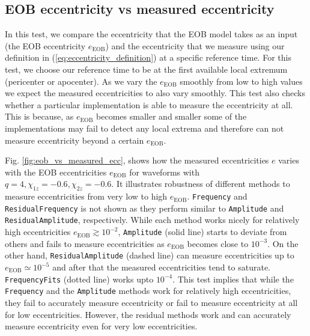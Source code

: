 \documentclass[aps,prd,amsmath,floats,floatfix, twocolumn,
superscriptaddress,nofootinbib,showpacs]{revtex4-1}
\newcommand{\eEOB}{e_{\text{EOB}}}
\newcommand{\mAmp}{\texttt{Amplitude}}
\newcommand{\mFreq}{\texttt{Frequency}}
\newcommand{\mResAmp}{\texttt{ResidualAmplitude}}
\newcommand{\mResFreq}{\texttt{ResidualFrequency}}
\newcommand{\mFreqFits}{\texttt{FrequencyFits}}
\begin{document}
\subsection{EOB eccentricity vs measured eccentricity}
\label{sec:eob-eccentricity-vs-measured-eccentricity} In this test, we
compare the eccentricity that the EOB model takes as an input (the EOB
eccentricity $\eEOB$) and the eccentricity that we measure
using our definition in (\ref{eq:eccentricity_definition}) at a
specific reference time. For this test, we choose our reference time
to be at the first available local extremum (pericenter or
apocenter). As we vary the $\eEOB$ smoothly from low to high
values we expect the measured eccentricities to also vary smoothly.
This test also checks whether a particular implementation is able to
measure the eccentricity at all. This is because, as $\eEOB$
becomes smaller and smaller some of the implementations may fail to
detect any local extrema and therefore can not measure eccentricity
beyond a certain $\eEOB$.

Fig. \ref{fig:eob_vs_measured_ecc}, shows how the measured
eccentricities $e$ varies with the EOB eccentricities $\eEOB$ for
waveforms with $q=4, \chi_{1z}=-0.6, \chi_{2z}=-0.6$. It illustrates
robustness of different methods to measure eccentricities from very
low to high $\eEOB$. \mFreq{} and \mResFreq{} is not shown as they
perform similar to \mAmp{} and \mResAmp{}, respectively.  While each
method works nicely for relatively high eccentricities $\eEOB \gtrsim
10^{-2}$, \mAmp{} (solid line) starts to deviate from others and fails
to measure eccentricities as $\eEOB$ becomes close to $10^{-3}$. On
the other hand, \mResAmp{} (dashed line) can measure eccentricities up
to $\eEOB \simeq 10^{-5}$ and after that the measured eccentricities
tend to saturate. \mFreqFits{} (dotted line) works upto
$10^{-4}$. This test implies that while the \mFreq{} and the \mAmp{}
methods work for relatively high eccentricities, they fail to
accurately measure eccentricity or fail to measure eccentricity at all
for low eccentricities. However, the residual methods work and can
accurately measure eccentricity even for very low eccentricities.
\end{document}
